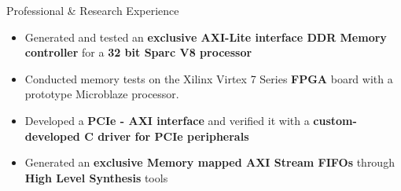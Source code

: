 \documentclass{resume}
\begin{document}
\begin{rSection}{Professional \& Research Experience}
\begin{itemize}[leftmargin=*]
	\item Generated and tested an {\bf exclusive AXI-Lite interface DDR Memory controller} for a {\bf 32 bit Sparc V8 processor}
	      
	\item Conducted memory tests on the Xilinx Virtex 7 Series {\bf FPGA} board with a prototype Microblaze processor.
	
	\item Developed a {\bf PCIe - AXI interface} and verified it with a {\bf custom-developed C driver for PCIe peripherals}

	\item Generated an {\bf exclusive Memory mapped AXI Stream FIFOs} through {\bf High Level Synthesis} tools

\end{itemize}

\end{rSection}
\end{document}
